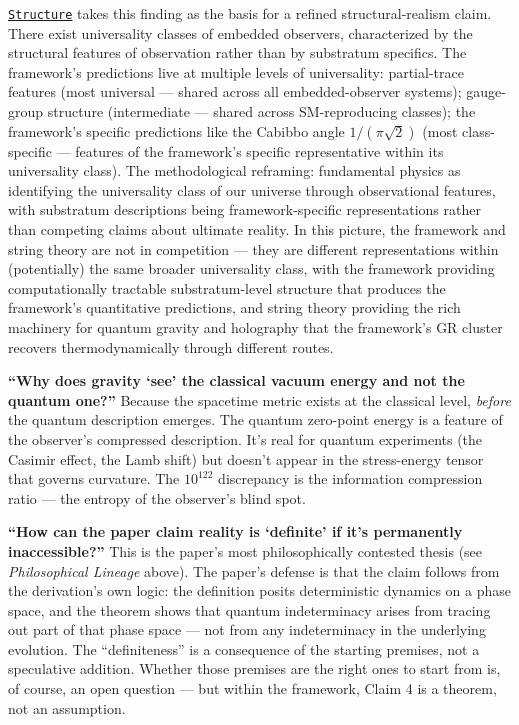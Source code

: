 \documentclass[
]{article}
\begin{document}
\href{Structure.md}{\texttt{Structure}} takes this finding as the basis
for a refined structural-realism claim. There exist universality classes
of embedded observers, characterized by the structural features of
observation rather than by substratum specifics. The framework's
predictions live at multiple levels of universality: partial-trace
features (most universal --- shared across all embedded-observer
systems); gauge-group structure (intermediate --- shared across
SM-reproducing classes); the framework's specific predictions like the
Cabibbo angle \(1/(\pi\sqrt{2})\) (most class-specific --- features of
the framework's specific representative within its universality class).
The methodological reframing: fundamental physics as identifying the
universality class of our universe through observational features, with
substratum descriptions being framework-specific representations rather
than competing claims about ultimate reality. In this picture, the
framework and string theory are not in competition --- they are
different representations within (potentially) the same broader
universality class, with the framework providing computationally
tractable substratum-level structure that produces the framework's
quantitative predictions, and string theory providing the rich machinery
for quantum gravity and holography that the framework's GR cluster
recovers thermodynamically through different routes.

\textbf{``Why does gravity `see' the classical vacuum energy and not the
quantum one?''} Because the spacetime metric exists at the classical
level, \emph{before} the quantum description emerges. The quantum
zero-point energy is a feature of the observer's compressed description.
It's real for quantum experiments (the Casimir effect, the Lamb shift)
but doesn't appear in the stress-energy tensor that governs curvature.
The \(10^{122}\) discrepancy is the information compression ratio ---
the entropy of the observer's blind spot.

\textbf{``How can the paper claim reality is `definite' if it's
permanently inaccessible?''} This is the paper's most philosophically
contested thesis (see \emph{Philosophical Lineage} above). The paper's
defense is that the claim follows from the derivation's own logic: the
definition posits deterministic dynamics on a phase space, and the
theorem shows that quantum indeterminacy arises from tracing out part of
that phase space --- not from any indeterminacy in the underlying
evolution. The ``definiteness'' is a consequence of the starting
premises, not a speculative addition. Whether those premises are the
right ones to start from is, of course, an open question --- but within
the framework, Claim 4 is a theorem, not an assumption.
\end{document}
